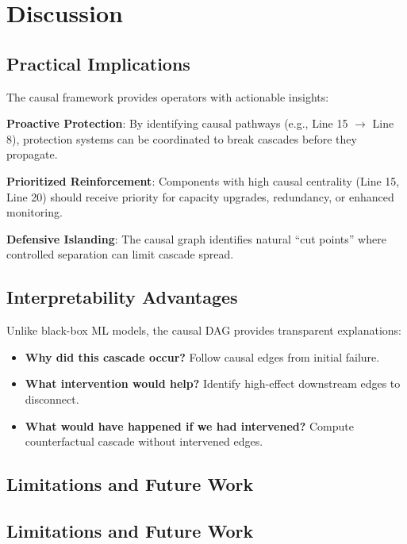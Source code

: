 \documentclass[journal,12pt,onecolumn]{IEEEtran}
\begin{document}
\section{Discussion}
\label{sec:discussion}

\subsection{Practical Implications}

The causal framework provides operators with actionable insights:

\textbf{Proactive Protection}: By identifying causal pathways (e.g., Line 15 $\rightarrow$ Line 8), protection systems can be coordinated to break cascades before they propagate.

\textbf{Prioritized Reinforcement}: Components with high causal centrality (Line 15, Line 20) should receive priority for capacity upgrades, redundancy, or enhanced monitoring.

\textbf{Defensive Islanding}: The causal graph identifies natural ``cut points'' where controlled separation can limit cascade spread.

\subsection{Interpretability Advantages}

Unlike black-box ML models, the causal DAG provides transparent explanations:
\begin{itemize}
    \item \textbf{Why did this cascade occur?} Follow causal edges from initial failure.
    \item \textbf{What intervention would help?} Identify high-effect downstream edges to disconnect.
    \item \textbf{What would have happened if we had intervened?} Compute counterfactual cascade without intervened edges.
\end{itemize}

\subsection{Limitations and Future Work}

\subsection{Limitations and Future Work}
\end{document}
